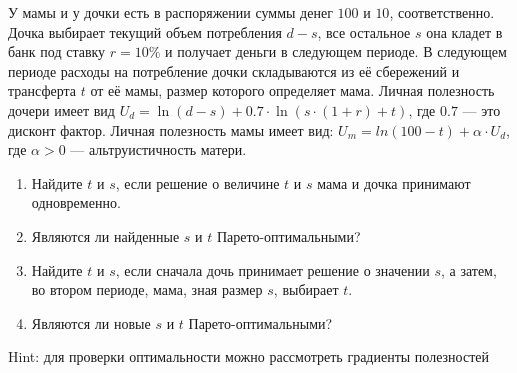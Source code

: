 \begin{problem}
\begin{source} \cite[5.16]{gintis:gte} \end{source}
У мамы и у дочки есть в распоряжении суммы денег  $100$  и  $10$, соответственно. Дочка выбирает текущий объем потребления $d-s$, все остальное $s$ она кладет в банк под ставку  $r=10\%$  и получает деньги в следующем периоде. В следующем периоде расходы на потребление дочки складываются из её сбережений и трансферта  $t$ от её мамы, размер которого определяет мама. Личная полезность дочери имеет вид  $U_{d} =\ln(d-s)+0.7\cdot \ln(s\cdot(1+r)+t)$, где  $0.7$  — это дисконт фактор. Личная полезность мамы имеет вид:  $U_{m} =ln(100-t)+\alpha \cdot U_{d} $, где  $\alpha >0$  — альтруистичность матери. \par
\begin{enumerate}
\item  Найдите $t$ и $s$, если решение о величине $t$ и $s$ мама и дочка принимают одновременно. \par
\item Являются ли найденные $s$ и $t$ Парето-оптимальными? \par
\item  Найдите $t$ и $s$, если сначала дочь принимает решение о значении $s$, а затем, во втором периоде, мама, зная размер $s$, выбирает $t$. \par
\item Являются ли новые $s$ и $t$ Парето-оптимальными? \par
\end{enumerate}
\begin{rem}
Hint: для проверки оптимальности можно рассмотреть градиенты полезностей \par
\end{rem}




\begin{sol}

\end{sol}
\end{problem}



